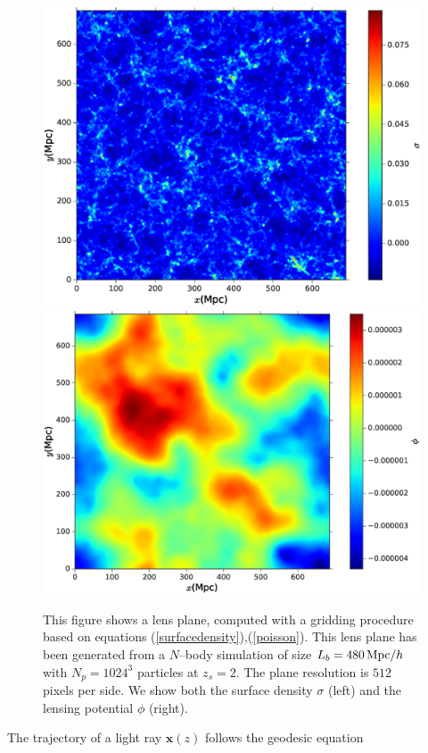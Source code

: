 \documentclass[5p]{elsarticle}
\newcommand{\bb}[1]{\mathbf{#1}}
\begin{document}
\begin{figure}
\begin{center}
\includegraphics[scale=0.35]{Figures/lens_plane_density.eps}
\includegraphics[scale=0.35]{Figures/lens_plane_potential.eps}
\caption{This figure shows a lens plane, computed with a gridding procedure based on equations (\ref{surfacedensity}),(\ref{poisson}). This lens plane has been generated from a $N$--body simulation of size $L_b=480\,{\rm Mpc}/h$ with $N_p=1024^3$ particles at $z_s=2$. The plane resolution is $512\,\,$pixels per side. We show both the surface density $\sigma$ (left) and the lensing potential $\phi$ (right).}
\label{lensplanefig}
\end{center}
\end{figure}
%
The trajectory of a light ray $\bb{x}(z)$ follows the geodesic equation
\end{document}
